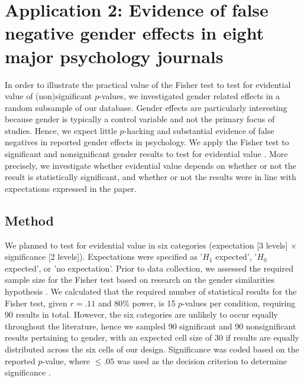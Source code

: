 \documentclass{article}
\begin{document}
\section*{Application 2: Evidence of false negative gender effects in eight major psychology journals}

In order to illustrate the practical value of the Fisher test to test for evidential value of (non)significant $p$-values, we investigated gender related effects in a random subsample of our database. Gender effects are particularly interesting because gender is typically a control variable and not the primary focus of studies. Hence, we expect little $p$-hacking and substantial evidence of false negatives in reported gender effects in psychology. We apply the Fisher test to significant and nonsignificant gender results to test for evidential value \cite{Van_Assen2015-gg,Simonsohn2014-dm}. More precisely, we investigate whether evidential value depends on whether or not the result is statistically significant, and whether or not the results were in line with expectations expressed in the paper.

\subsection*{Method}

We planned to test for evidential value in six categories (expectation [3 levels] $\times$ significance [2 levels]). Expectations were specified as '$H_1$ expected', '$H_0$ expected', or 'no expectation'. Prior to data collection, we assessed the required sample size for the Fisher test based on research on the gender similarities hypothesis \cite{Hyde2005-gj}. We calculated that the required number of statistical results for the Fisher test, given $r=.11$ \cite{Hyde2005-gj} and 80\% power, is 15 $p$-values per condition, requiring 90 results in total. However, the six categories are unlikely to occur equally throughout the literature, hence we sampled 90 significant and 90 nonsignificant results pertaining to gender, with an expected cell size of 30 if results are equally distributed across the six cells of our design. Significance was coded based on the reported $p$-value, where $\leq.05$ was used as the decision criterion to determine significance \cite{Nuijten2015-od}.
\end{document}
